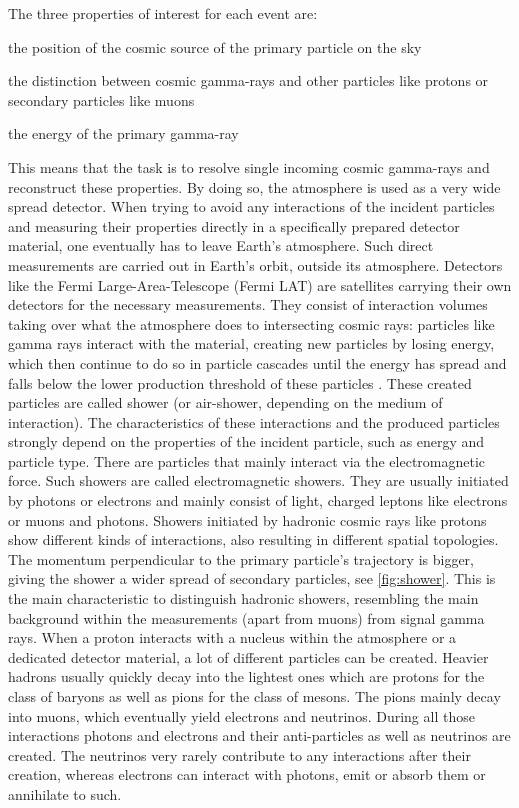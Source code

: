 The three properties of interest for each event are:
%
\begin{description}[labelsep=1em]
  \item[source position]{the position of the cosmic source of the primary particle on the sky}
  \item[particle type]{the distinction between cosmic gamma-rays and other particles like protons or secondary particles like muons}
  \item[particle energy]{the energy of the primary gamma-ray}
\end{description}
%
This means that the task is to resolve single incoming cosmic gamma-rays and
reconstruct these properties. By doing so, the atmosphere is used as a very
wide spread detector. When trying to avoid any interactions of the incident
particles and measuring their properties directly in a specifically prepared
detector material, one eventually has to leave Earth's atmosphere. Such direct
measurements are carried out in Earth's orbit, outside its atmosphere.
Detectors like the Fermi Large-Area-Telescope \cite{fermiLAT} (Fermi LAT) are satellites
carrying their own detectors for the necessary measurements. They consist of
interaction volumes taking over what the atmosphere does to intersecting cosmic
rays: particles like gamma rays interact with the material, creating new
particles by losing energy, which then continue to do so in particle cascades
until the energy has spread and falls below the lower production threshold of these particles \cite{aharonian}. These created particles are called
shower (or air-shower, depending on the medium of interaction). The
characteristics of these interactions and the produced particles strongly
depend on the properties of the incident particle, such as energy and particle
type. There are particles that mainly interact via the electromagnetic force.
Such showers are called electromagnetic showers. They are usually initiated by
photons or electrons and mainly consist of light, charged leptons like electrons or muons and photons. Showers initiated by
hadronic cosmic rays like protons show different kinds of interactions, also
resulting in different spatial topologies. The momentum perpendicular to the
primary particle's trajectory is bigger, giving the shower a wider spread of
secondary particles, see \autoref{fig:shower}. This is the main characteristic to distinguish hadronic
showers, resembling the main background within the measurements (apart from
muons) from signal gamma rays. When a proton interacts with a
nucleus within the atmosphere or a dedicated detector material, a lot of
different particles can be created. Heavier hadrons usually quickly decay into
the lightest ones which are protons for the class of baryons as well as pions
for the class of mesons. The pions mainly decay into muons, which eventually
yield electrons and neutrinos. During all those interactions photons and
electrons and their anti-particles as well as neutrinos are created. The
neutrinos very rarely contribute to any interactions after their creation,
whereas electrons can interact with photons, emit or absorb them or annihilate
to such.


